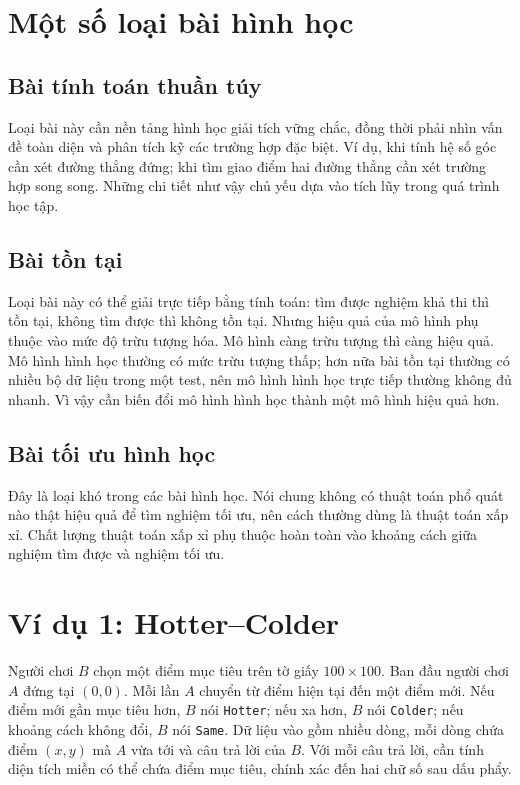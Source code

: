 \documentclass[11pt]{article}
\begin{document}
\section{Một số loại bài hình học}

\subsection{Bài tính toán thuần túy}

Loại bài này cần nền tảng hình học giải tích vững chắc, đồng thời phải nhìn
vấn đề toàn diện và phân tích kỹ các trường hợp đặc biệt. Ví dụ, khi tính hệ
số góc cần xét đường thẳng đứng; khi tìm giao điểm hai đường thẳng cần xét
trường hợp song song. Những chi tiết như vậy chủ yếu dựa vào tích lũy trong
quá trình học tập.

\subsection{Bài tồn tại}

Loại bài này có thể giải trực tiếp bằng tính toán: tìm được nghiệm khả thi thì
tồn tại, không tìm được thì không tồn tại. Nhưng hiệu quả của mô hình phụ
thuộc vào mức độ trừu tượng hóa. Mô hình càng trừu tượng thì càng hiệu quả.
Mô hình hình học thường có mức trừu tượng thấp; hơn nữa bài tồn tại thường có
nhiều bộ dữ liệu trong một test, nên mô hình hình học trực tiếp thường không
đủ nhanh. Vì vậy cần biến đổi mô hình hình học thành một mô hình hiệu quả hơn.

\subsection{Bài tối ưu hình học}

Đây là loại khó trong các bài hình học. Nói chung không có thuật toán phổ quát
nào thật hiệu quả để tìm nghiệm tối ưu, nên cách thường dùng là thuật toán xấp
xỉ. Chất lượng thuật toán xấp xỉ phụ thuộc hoàn toàn vào khoảng cách giữa
nghiệm tìm được và nghiệm tối ưu.

\section{Ví dụ 1: Hotter--Colder}

Người chơi \(B\) chọn một điểm mục tiêu trên tờ giấy \(100\times100\). Ban đầu
người chơi \(A\) đứng tại \((0,0)\). Mỗi lần \(A\) chuyển từ điểm hiện tại đến
một điểm mới. Nếu điểm mới gần mục tiêu hơn, \(B\) nói \texttt{Hotter}; nếu xa
hơn, \(B\) nói \texttt{Colder}; nếu khoảng cách không đổi, \(B\) nói
\texttt{Same}. Dữ liệu vào gồm nhiều dòng, mỗi dòng chứa điểm \((x,y)\) mà
\(A\) vừa tới và câu trả lời của \(B\). Với mỗi câu trả lời, cần tính diện
tích miền có thể chứa điểm mục tiêu, chính xác đến hai chữ số sau dấu phẩy.
\end{document}
